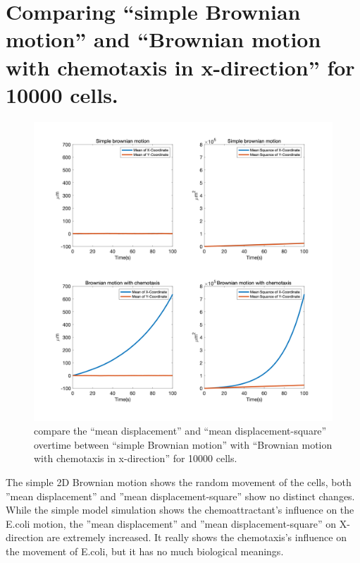 
\section{Comparing ``simple Brownian motion'' and ``Brownian motion with chemotaxis in x-direction'' for 10000 cells.}

\begin{figure}[H]
\centering
\includegraphics[width=1\linewidth]{Figures/P2_fig4.png}
\caption{compare the ``mean displacement'' and ``mean displacement-square'' overtime between ``simple Brownian motion'' with ``Brownian motion with chemotaxis in x-direction'' for 10000 cells.}
\label{P2_fig4}
\end{figure}

\newpage
The simple 2D Brownian motion shows the random movement of the cells, both ”mean displacement” and ”mean displacement-square” show no distinct changes.
While the simple model simulation shows the chemoattractant’s inﬂuence on the E.coli motion, the ”mean displacement” and ”mean displacement-square” on X-direction are extremely increased. It really shows the chemotaxis’s inﬂuence on the movement of E.coli, but it has no much biological meanings.





